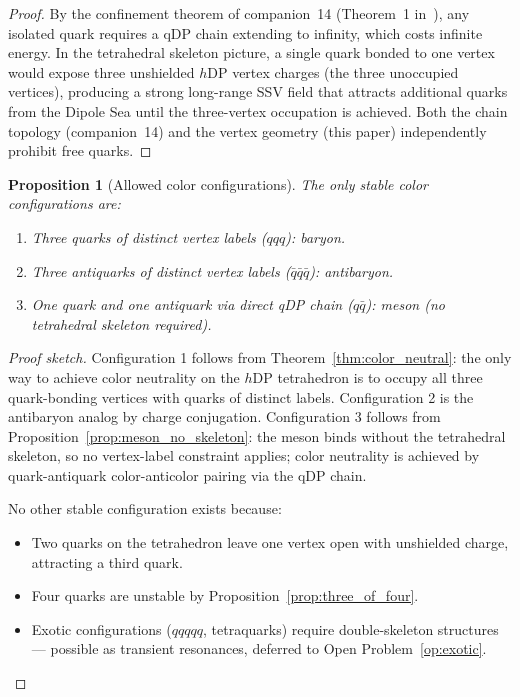 \documentclass[12pt]{article}
\newtheorem{proposition}[theorem]{Proposition}
\newcommand{\hDP}{h\mathrm{DP}}
\begin{document}
\begin{proof}
By the confinement theorem of companion~14 (Theorem~1 in~\cite{c14}), any
isolated quark requires a qDP chain extending to infinity, which
costs infinite energy.  In the tetrahedral skeleton picture, a
single quark bonded to one vertex would expose three unshielded
$\hDP$ vertex charges (the three unoccupied vertices), producing
a strong long-range SSV field that attracts additional quarks
from the Dipole Sea until the three-vertex occupation is achieved.
Both the chain topology (companion~14) and the vertex geometry
(this paper) independently prohibit free quarks.
\end{proof}

\begin{proposition}[Allowed color configurations]
\label{prop:allowed_configs}
The only stable color configurations are:
\begin{enumerate}[noitemsep]
\item Three quarks of distinct vertex labels ($qqq$): baryon.
\item Three antiquarks of distinct vertex labels ($\bar{q}\bar{q}\bar{q}$):
  antibaryon.
\item One quark and one antiquark via direct qDP chain ($q\bar{q}$):
  meson (no tetrahedral skeleton required).
\end{enumerate}
\end{proposition}

\begin{proof}[Proof sketch]
Configuration 1 follows from Theorem~\ref{thm:color_neutral}: the
only way to achieve color neutrality on the $\hDP$ tetrahedron is to
occupy all three quark-bonding vertices with quarks of distinct labels.
Configuration 2 is the antibaryon analog by charge conjugation.
Configuration 3 follows from Proposition~\ref{prop:meson_no_skeleton}:
the meson binds without the tetrahedral skeleton, so no vertex-label
constraint applies; color neutrality is achieved by quark-antiquark
color-anticolor pairing via the qDP chain.

No other stable configuration exists because:
\begin{itemize}[noitemsep]
\item Two quarks on the tetrahedron leave one vertex open with
  unshielded charge, attracting a third quark.
\item Four quarks are unstable by Proposition~\ref{prop:three_of_four}.
\item Exotic configurations ($qqqqq$, tetraquarks) require double-skeleton
  structures — possible as transient resonances, deferred to
  Open Problem~\ref{op:exotic}.
\end{itemize}
\end{proof}
\end{document}
